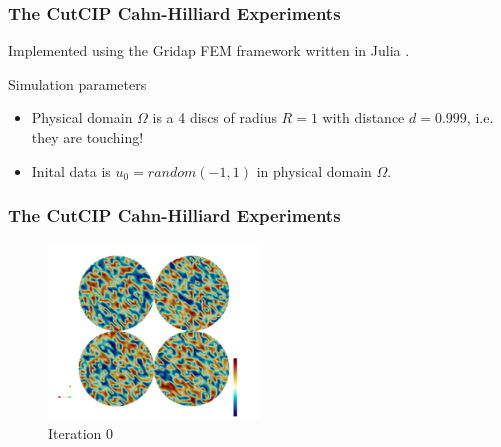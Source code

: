 \begin{frame}
\frametitle{The CutCIP Cahn-Hilliard Experiments}
Implemented using the Gridap FEM framework written in Julia \footnotemark[1].


\begin{block}{Simulation parameters}
    \begin{itemize}
        \item Physical domain $\Omega$  is a 4 discs of radius $R=1$ with distance $d=0.999$, i.e. they are touching!
        \item Inital data is $u_0 = random(-1,1)$ in physical domain $\Omega $.
    \end{itemize}
\end{block}



\end{frame}

\begin{frame}
\frametitle{The CutCIP Cahn-Hilliard Experiments}

\begin{figure}[h]
    \centering
    \includegraphics[width=0.5\textwidth]{CH-example/0.png}
    \caption{Iteration 0}
    \label{fig:your_image_label}
\end{figure}
\end{frame}

